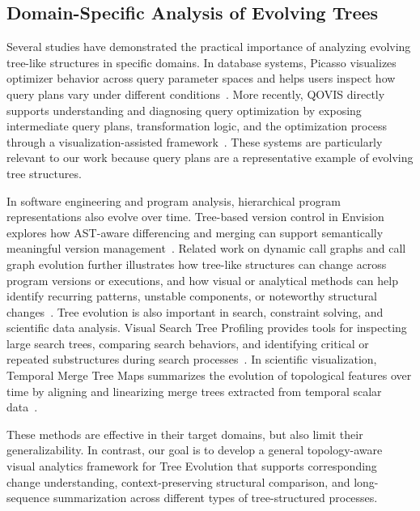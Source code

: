 \subsection{Domain-Specific Analysis of Evolving Trees}

Several studies have demonstrated the practical importance of analyzing evolving tree-like structures in specific domains. In database systems, Picasso visualizes optimizer behavior across query parameter spaces and helps users inspect how query plans vary under different conditions~\cite{Sudarshan2010Picasso}. More recently, QOVIS directly supports understanding and diagnosing query optimization by exposing intermediate query plans, transformation logic, and the optimization process through a visualization-assisted framework~\cite{Tian2025QOVIS}. These systems are particularly relevant to our work because query plans are a representative example of evolving tree structures.

In software engineering and program analysis, hierarchical program representations also evolve over time. Tree-based version control in Envision explores how AST-aware differencing and merging can support semantically meaningful version management~\cite{Schneider2015EnvisionVC}. Related work on dynamic call graphs and call graph evolution further illustrates how tree-like structures can change across program versions or executions, and how visual or analytical methods can help identify recurring patterns, unstable components, or noteworthy structural changes~\cite{Praun2012DynamicCallGraphs,Bao2022CallGraphEvolution}. Tree evolution is also important in search, constraint solving, and scientific data analysis. Visual Search Tree Profiling provides tools for inspecting large search trees, comparing search behaviors, and identifying critical or repeated substructures during search processes~\cite{Dubois2015SearchTreeProfiling}. In scientific visualization, Temporal Merge Tree Maps summarizes the evolution of topological features over time by aligning and linearizing merge trees extracted from temporal scalar data~\cite{Kopp2022TemporalMergeTreeMaps}.

These methods are effective in their target domains, but also limit their generalizability. In contrast, our goal is to develop a general topology-aware visual analytics framework for Tree Evolution that supports corresponding change understanding, context-preserving structural comparison, and long-sequence summarization across different types of tree-structured processes.

